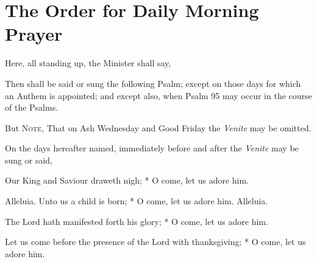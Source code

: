 \section{The Order for Daily Morning Prayer}
\begin{rubric}
    Here, all standing up, the Minister shall say,
\end{rubric}
\begin{rubric}
    Then shall be said or sung the following Psalm; except on those days for which an Anthem is appointed; and except also, when Psalm 95 may occur in the course of the Psalms.
\end{rubric}
\begin{rubric}
    But \textsc{Note}, That on Ash Wednesday and Good Friday the \emph{Venite} may be omitted.
\end{rubric}
\begin{rubric}
    On the days hereafter named, immediately before and after the \emph{Venite} may be sung or said,
\end{rubric}
\par\noindent
{} Our King and Saviour draweth nigh; * O come, let us adore him.
\par\noindent
{} Alleluia. Unto us a child is born; * O come, let us adore him. Alleluia.
\par\noindent
{} The Lord hath manifested forth his glory; * O come, let us adore him.
\par\noindent
 Let us come before the presence of the Lord with thanksgiving;  * O come, let us adore him.
\par\noindent
